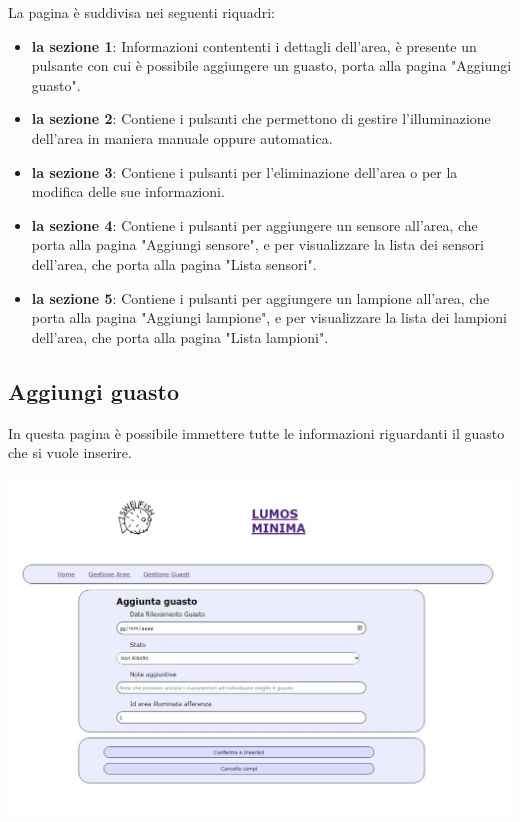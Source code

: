 \documentclass[9pt]{article}
\begin{document}
La pagina è suddivisa nei seguenti riquadri:
\begin{itemize}
	\item \textbf{la sezione 1}: Informazioni contententi i dettagli dell'area, è presente un pulsante con cui è possibile aggiungere un guasto, porta alla pagina "Aggiungi guasto".
	\item \textbf{la sezione 2}: Contiene i pulsanti che permettono di gestire l'illuminazione dell'area in maniera manuale oppure automatica.
	\item \textbf{la sezione 3}: Contiene i pulsanti per l'eliminazione dell'area o per la modifica delle sue informazioni.
	\item \textbf{la sezione 4}: Contiene i pulsanti per aggiungere un sensore all'area, che porta alla pagina "Aggiungi sensore", e per visualizzare la lista dei sensori dell'area, che porta alla pagina "Lista sensori".
	\item \textbf{la sezione 5}: Contiene i pulsanti per aggiungere un lampione all'area, che porta alla pagina "Aggiungi lampione", e per visualizzare la lista dei lampioni dell'area, che porta alla pagina "Lista lampioni".
\end{itemize}

\subsection{Aggiungi guasto}
In questa pagina è possibile immettere tutte le informazioni riguardanti il guasto che si vuole inserire.

\begin{center}
	\includegraphics[scale=0.3]{Aggiungi_guasto.png}
\end{center}
\end{document}
